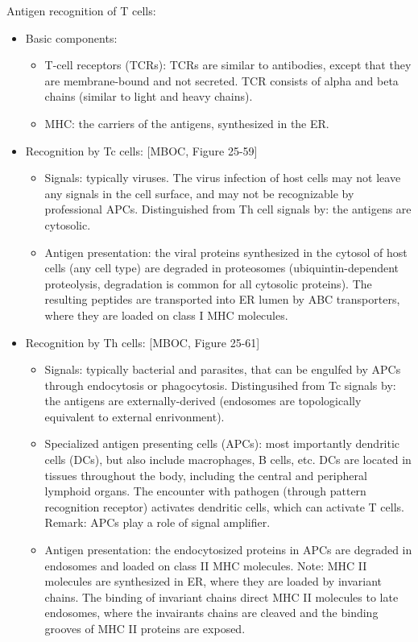 \documentclass{report}
\begin{document}
Antigen recognition of T cells: 
\begin{itemize}
\item Basic components: 
\begin{itemize}
	\item T-cell receptors (TCRs): TCRs are similar to antibodies, except that they are membrane-bound and not secreted. TCR consists of alpha and beta chains (similar to light and heavy chains).
	\item MHC: the carriers of the antigens, synthesized in the ER. 
\end{itemize}

\item Recognition by Tc cells: [MBOC, Figure 25-59]
\begin{itemize}
	\item Signals: typically viruses. The virus infection of host cells may not leave any signals in the cell surface, and may not be recognizable by professional APCs. Distinguished from Th cell signals by: the antigens are cytosolic. 
	\item Antigen presentation: the viral proteins synthesized in the cytosol of host cells (any cell type) are degraded in proteosomes (ubiquintin-dependent proteolysis, degradation is common for all cytosolic proteins). The resulting peptides are transported into ER lumen by ABC transporters, where they are loaded on class I MHC molecules. 
\end{itemize}

\item Recognition by Th cells: [MBOC, Figure 25-61]
\begin{itemize}
	\item Signals: typically bacterial and parasites, that can be engulfed by APCs through endocytosis or phagocytosis. Distingusihed from Tc signals by: the antigens are externally-derived (endosomes are topologically equivalent to external enrivonment). 
		\item Specialized antigen presenting cells (APCs): most importantly dendritic cells (DCs), but also include macrophages, B cells, etc. DCs are located in tissues throughout the body, including the central and peripheral lymphoid organs. The encounter with pathogen (through pattern recognition receptor) activates dendritic cells, which can activate T cells. Remark: APCs play a role of signal amplifier. 
	\item Antigen presentation: the endocytosized proteins in APCs are degraded in endosomes and loaded on class II MHC molecules. Note: MHC II molecules are synthesized in ER, where they are loaded by invariant chains. The binding of invariant chains direct MHC II molecules to late endosomes, where the invairants chains are cleaved and the binding grooves of MHC II proteins are exposed. 
\end{itemize}


\end{itemize}
\end{document}
